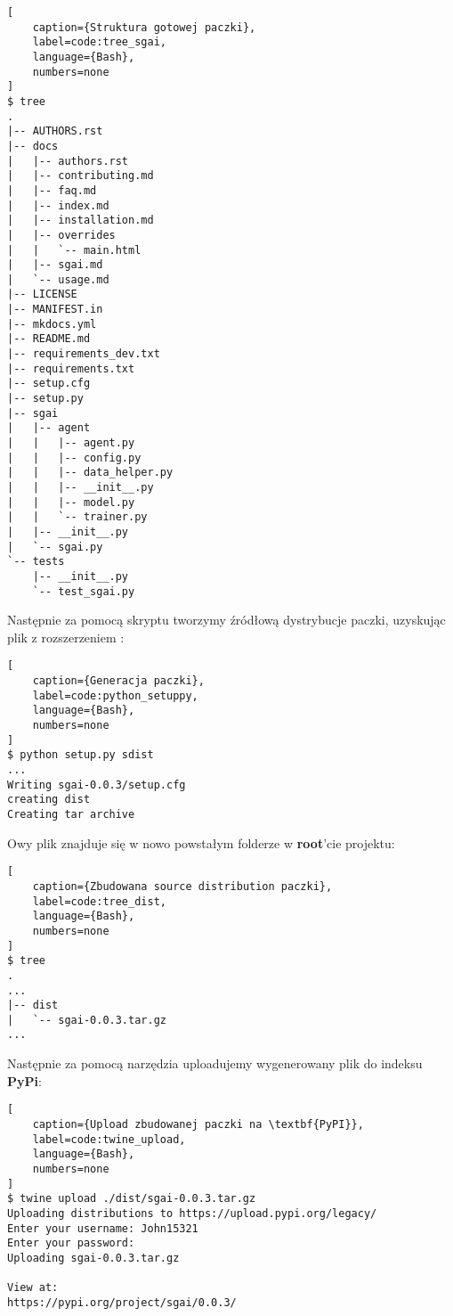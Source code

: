 \begin{onepage}
    \begin{lstlisting}[
    caption={Struktura gotowej paczki},
    label=code:tree_sgai,
    language={Bash},
    numbers=none
]
$ tree
.
|-- AUTHORS.rst
|-- docs
|   |-- authors.rst
|   |-- contributing.md
|   |-- faq.md
|   |-- index.md
|   |-- installation.md
|   |-- overrides
|   |   `-- main.html
|   |-- sgai.md
|   `-- usage.md
|-- LICENSE
|-- MANIFEST.in
|-- mkdocs.yml
|-- README.md
|-- requirements_dev.txt
|-- requirements.txt
|-- setup.cfg
|-- setup.py
|-- sgai
|   |-- agent
|   |   |-- agent.py
|   |   |-- config.py
|   |   |-- data_helper.py
|   |   |-- __init__.py
|   |   |-- model.py
|   |   `-- trainer.py
|   |-- __init__.py
|   `-- sgai.py
`-- tests
    |-- __init__.py
    `-- test_sgai.py
    \end{lstlisting}
\end{onepage}



Następnie za pomocą skryptu  tworzymy źródłową dystrybucje paczki, uzyskując plik z rozszerzeniem :

\begin{onepage}
    \begin{lstlisting}[
    caption={Generacja paczki},
    label=code:python_setuppy,
    language={Bash},
    numbers=none
]
$ python setup.py sdist
...
Writing sgai-0.0.3/setup.cfg
creating dist
Creating tar archive
    \end{lstlisting}
\end{onepage}

Owy plik znajduje się w nowo powstałym folderze  w \textbf{root}'cie projektu:

\begin{onepage}
    \begin{lstlisting}[
    caption={Zbudowana source distribution paczki},
    label=code:tree_dist,
    language={Bash},
    numbers=none
]
$ tree
.
...
|-- dist
|   `-- sgai-0.0.3.tar.gz
...
    \end{lstlisting}
\end{onepage}


Następnie za pomocą narzędzia  uploadujemy wygenerowany plik do indeksu \textbf{PyPi}:

\begin{onepage}
    \begin{lstlisting}[
    caption={Upload zbudowanej paczki na \textbf{PyPI}},
    label=code:twine_upload,
    language={Bash},
    numbers=none
]
$ twine upload ./dist/sgai-0.0.3.tar.gz
Uploading distributions to https://upload.pypi.org/legacy/
Enter your username: John15321
Enter your password:
Uploading sgai-0.0.3.tar.gz

View at:
https://pypi.org/project/sgai/0.0.3/
    \end{lstlisting}
\end{onepage}


